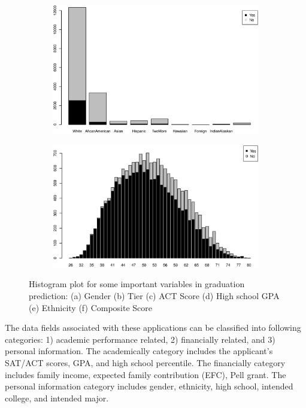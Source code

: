 \documentclass[12pt,english]{report}
\begin{document}
\begin{figure}[p]
\medskip
\begin{subfigure}{0.48\textwidth}
\includegraphics[width=\linewidth]{pic/grad_ethnicity}
\caption{} \label{grad:e}
\end{subfigure}\hspace*{\fill}
\begin{subfigure}{0.48\textwidth}
\includegraphics[width=\linewidth]{pic/grad_comp}
\caption{} \label{grad:f}
\end{subfigure}
  \caption{Histogram plot for some important variables in graduation
prediction: 
                        (a) Gender (b) Tier (c) ACT Score (d) High school GPA
(e) Ethnicity (f) Composite Score} 
  \label{grad_sum} 
\end{figure}


The data fields associated with these applications can be classified into
following
categories: 1) academic performance related, 2) financially related, and 3) 
personal information.  The academically category includes the applicant's
SAT/ACT 
scores, GPA, and  high school percentile. The financially  category includes
family
income, expected family contribution (EFC), Pell grant. The personal
information
category includes gender, ethnicity, high school, intended college, and
intended major.
\end{document}
